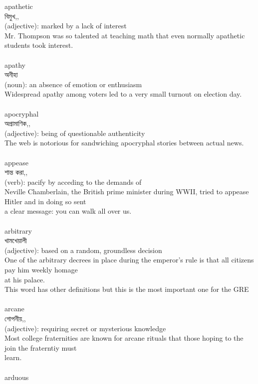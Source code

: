 \documentclass{article}
\begin{document}
{apathetic}\\
{বিমুখ,,}\\
{(adjective): marked by a lack of interest\\Mr. Thompson was so talented at teaching math that even normally apathetic students took interest.\\}\\
{apathy}\\
{অনীহা}\\
{(noun): an absence of emotion or enthusiasm\\Widespread apathy among voters led to a very small turnout on election day.\\}\\
{apocryphal}\\
{অপ্রামাণিক,,}\\
{(adjective): being of questionable authenticity\\The web is notorious for sandwiching apocryphal stories between actual news.\\}\\
{appease}\\
{শান্ত করা,,}\\
{(verb): pacify by acceding to the demands of\\Neville Chamberlain, the British prime minister during WWII, tried to appease Hitler and in doing so sent\\a clear message: you can walk all over us.\\}\\
{arbitrary}\\
{খামখেয়ালী}\\
{(adjective): based on a random, groundless decision\\One of the arbitrary decrees in place during the emperor's rule is that all citizens pay him weekly homage\\at his palace.\\This word has other definitions but this is the most important one for the GRE\\}\\
{arcane}\\
{গোপনীয়,,}\\
{(adjective): requiring secret or mysterious knowledge\\Most college fraternities are known for arcane rituals that those hoping to the join the fraterntiy must\\learn.\\}\\
{arduous}\\
\end{document}
